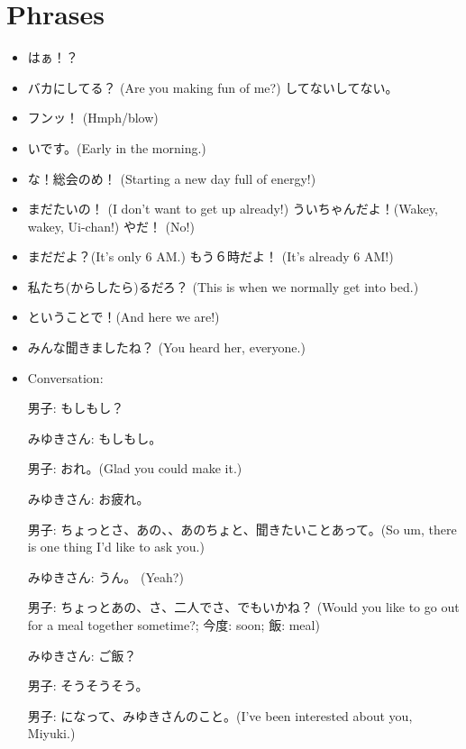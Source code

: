 \documentclass[../nihongo-gakushuu-kyouzai-grammar.tex]{subfiles}
\begin{document}
\appendix
\setcounter{section}{1}
\section{Phrases}

\begin{itemize}
    \item はぁ！？
    \item バカにしてる？ (Are you making fun of me?) してないしてない。
    \item フンッ！ (Hmph/blow)
    \item {}いです。(Early in the morning.)
    \item {}な！総会のめ！ (Starting a new day full of energy!)
    \item まだたいの！ (I don't want to get up already!) ういちゃんだよ！(Wakey, wakey, Ui-chan!) やだ！ (No!)
    \item まだだよ？(It's only 6 AM.) もう６時だよ！ (It's already 6 AM!)
    \item 私たち(からしたら)るだろ？ (This is when we normally get into bed.)
    \item ということで！(And here we are!)
    \item みんな聞きましたね？ (You heard her, everyone.)

    \item Conversation: %

    男子: もしもし？

    みゆきさん: もしもし。

    男子: おれ。(Glad you could make it.)

    みゆきさん: お疲れ。

    男子: ちょっとさ、あの、、あのちょと、聞きたいことあって。(So um, there is one thing I'd like to ask you.)

    みゆきさん: うん。 (Yeah?)

    男子: ちょっとあの、さ、二人でさ、でもいかね？ (Would you like to go out for a meal together sometime?; 今度: soon; 飯: meal)

    みゆきさん: ご飯？

    男子: そうそうそう。

    男子: になって、みゆきさんのこと。(I've been interested about you, Miyuki.)


\end{itemize}
\end{document}
